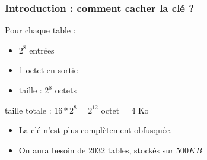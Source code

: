 \documentclass[15pt]{beamer}
\begin{document}

\begin{frame}
  \frametitle{Introduction : comment cacher la clé ?}
  \begin{figure}
    \begin{center}
    \end{center}
  \end{figure}

  Pour chaque table :
  \begin{itemize}
  \item $2^8$ entrées
  \item 1 octet en sortie
  \item taille : $2^8$ octets
  \end{itemize}

  taille totale : $16 * 2^8 = 2^{12}$ octet = 4 Ko

  \pause
  \vspace{0.7cm}

  \begin{itemize}
  \item La clé n'est plus complètement obfusquée.
  \item<2->On aura besoin de $2032$ tables, stockés sur $500KB$
  \end{itemize}
\end{frame}
\end{document}
